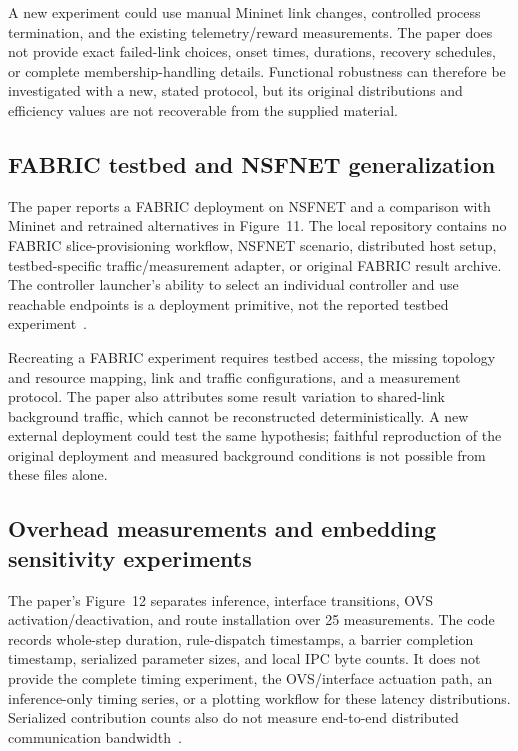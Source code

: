 \documentclass[11pt,a4paper]{article}
\begin{document}
A new experiment could use manual Mininet link changes, controlled process
termination, and the existing telemetry/reward measurements. The paper does
not provide exact failed-link choices, onset times, durations, recovery
schedules, or complete membership-handling details. Functional robustness can
therefore be investigated with a new, stated protocol, but its original
distributions and efficiency values are not recoverable from the supplied
material.

\subsection{FABRIC testbed and NSFNET generalization}

The paper reports a FABRIC deployment on NSFNET and a comparison with Mininet
and retrained alternatives in Figure~11. The local repository contains no
FABRIC slice-provisioning workflow, NSFNET scenario, distributed host setup,
testbed-specific traffic/measurement adapter, or original FABRIC result
archive. The controller launcher's ability to select an individual controller
and use reachable endpoints is a deployment primitive, not the reported
testbed experiment~\cite{paper,code-runtime}.

Recreating a FABRIC experiment requires testbed access, the missing topology
and resource mapping, link and traffic configurations, and a measurement
protocol. The paper also attributes some result variation to shared-link
background traffic, which cannot be reconstructed deterministically. A new
external deployment could test the same hypothesis; faithful reproduction of
the original deployment and measured background conditions is not possible
from these files alone.

\subsection{Overhead measurements and embedding sensitivity experiments}

The paper's Figure~12 separates inference, interface transitions, OVS
activation/deactivation, and route installation over 25 measurements.
The code records whole-step duration, rule-dispatch timestamps, a barrier
completion timestamp, serialized parameter sizes, and local IPC byte counts.
It does not provide the complete timing experiment, the OVS/interface
actuation path, an inference-only timing series, or a plotting workflow for
these latency distributions. Serialized contribution counts also do not
measure end-to-end distributed communication bandwidth~\cite{paper,code-routing,code-workers}.
\end{document}
